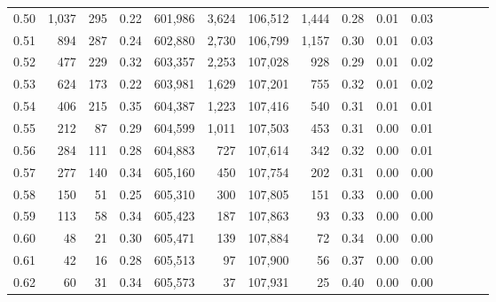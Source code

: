 \begin{tabular}{rrrcrrrrrrrrrrr}
0.50 &    1,037 &     295 &                                       0.22 &  601,986 &    3,624 &  106,512 &    1,444 &  0.28 &  0.01 &                         0.03 \\
0.51 &      894 &     287 &                                       0.24 &  602,880 &    2,730 &  106,799 &    1,157 &  0.30 &  0.01 &                         0.03 \\
0.52 &      477 &     229 &                                       0.32 &  603,357 &    2,253 &  107,028 &      928 &  0.29 &  0.01 &                         0.02 \\
0.53 &      624 &     173 &                                       0.22 &  603,981 &    1,629 &  107,201 &      755 &  0.32 &  0.01 &                         0.02 \\
0.54 &      406 &     215 &                                       0.35 &  604,387 &    1,223 &  107,416 &      540 &  0.31 &  0.01 &                         0.01 \\
0.55 &      212 &      87 &                                       0.29 &  604,599 &    1,011 &  107,503 &      453 &  0.31 &  0.00 &                         0.01 \\
0.56 &      284 &     111 &                                       0.28 &  604,883 &      727 &  107,614 &      342 &  0.32 &  0.00 &                         0.01 \\
0.57 &      277 &     140 &                                       0.34 &  605,160 &      450 &  107,754 &      202 &  0.31 &  0.00 &                         0.00 \\
0.58 &      150 &      51 &                                       0.25 &  605,310 &      300 &  107,805 &      151 &  0.33 &  0.00 &                         0.00 \\
0.59 &      113 &      58 &                                       0.34 &  605,423 &      187 &  107,863 &       93 &  0.33 &  0.00 &                         0.00 \\
0.60 &       48 &      21 &                                       0.30 &  605,471 &      139 &  107,884 &       72 &  0.34 &  0.00 &                         0.00 \\
0.61 &       42 &      16 &                                       0.28 &  605,513 &       97 &  107,900 &       56 &  0.37 &  0.00 &                         0.00 \\
0.62 &       60 &      31 &                                       0.34 &  605,573 &       37 &  107,931 &       25 &  0.40 &  0.00 &                         0.00 \\

\end{tabular}
